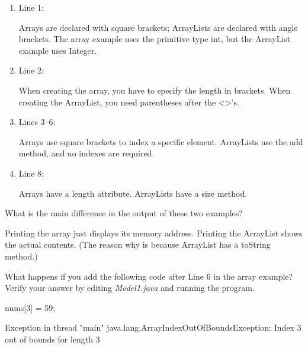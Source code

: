 \begin{enumerate}[itemsep=1ex]

\item Line 1: \vspace{-1ex}
\begin{answer}[2em]
Arrays are declared with square brackets; ArrayLists are declared with angle brackets.
The array example uses the primitive type int, but the ArrayList example uses Integer.
\end{answer}

\item Line 2: \vspace{-1ex}
\begin{answer}[2em]
When creating the array, you have to specify the length in brackets.
When creating the ArrayList, you need parentheses after the <>'s.
\end{answer}

\item Lines 3--6: \vspace{-1ex}
\begin{answer}[2em]
Arrays use square brackets to index a specific element.
ArrayLists use the add method, and no indexes are required.
\end{answer}

\item Line 8: \vspace{-1ex}
\begin{answer}[2em]
Arrays have a length attribute.
ArrayLists have a size method.
\end{answer}

\end{enumerate}


\Q What is the main difference in the output of these two examples?

\begin{answer}
Printing the array just displays its memory address.
Printing the ArrayList shows the actual contents.
(The reason why is because ArrayList has a toString method.)
\end{answer}


\Q What happens if you add the following code after Line 6 in the array example?
Verify your answer by editing \textit{Model1.java} and running the program.

\begin{javalst}
nums[3] = 59;
\end{javalst}

\begin{answer}
\begin{javaans}
Exception in thread "main" java.lang.ArrayIndexOutOfBoundsException:
Index 3 out of bounds for length 3
\end{javaans}
\end{answer}


